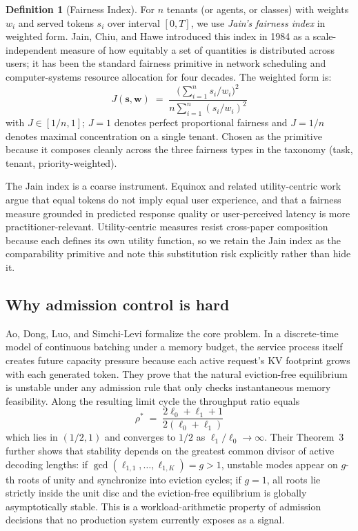 \documentclass[10pt]{article} %
\theoremstyle{definition}
\newtheorem{definition}{Definition}
\begin{document}
\begin{definition}[Fairness Index]
\label{def:fairness}
For $n$ tenants (or agents, or classes) with weights $w_i$ and served
tokens $s_i$ over interval $[0, T]$, we use \emph{Jain's fairness
index} \citep{jain1984fairness} in weighted form. Jain, Chiu, and Hawe
introduced this index in 1984 as a scale-independent measure of how
equitably a set of quantities is distributed across users; it has
been the standard fairness primitive in network scheduling and
computer-systems resource allocation for four decades. The weighted
form is:
%
\begin{equation}
J(\mathbf{s}, \mathbf{w}) \;=\; \frac{\bigl(\sum_{i=1}^{n} s_i / w_i\bigr)^2}{n \sum_{i=1}^{n} (s_i / w_i)^2}
\label{eq:jain}
\end{equation}
%
with $J \in [1/n, 1]$; $J = 1$ denotes perfect proportional fairness
and $J = 1/n$ denotes maximal concentration on a single tenant. Chosen
as the primitive because it composes cleanly across the three
fairness types in the taxonomy (task, tenant, priority-weighted).

The Jain index is a coarse instrument. Equinox \citep{lu2025equinox}
and related utility-centric work argue that equal tokens do not imply
equal user experience, and that a fairness measure grounded in
predicted response quality or user-perceived latency is more
practitioner-relevant. Utility-centric measures resist cross-paper
composition because each defines its own utility function, so we
retain the Jain index as the comparability primitive and note this
substitution risk explicitly rather than hide it.
\end{definition}

\subsection{Why admission control is hard}
\label{sec:whyhard}

Ao, Dong, Luo, and Simchi-Levi \citep{ao2026sic} formalize the core
problem. In a discrete-time model of continuous batching under a memory
budget, the service process itself creates future capacity pressure
because each active request's KV footprint grows with each generated
token. They prove that the natural eviction-free equilibrium is
unstable under any admission rule that only checks instantaneous
memory feasibility. Along the resulting limit cycle the throughput
ratio equals
%
\begin{equation}
\rho^{\ast} \;=\; \frac{2\ell_0 + \ell_1 + 1}{2(\ell_0 + \ell_1)}
\label{eq:throughput-bound}
\end{equation}
%
which lies in $(1/2, 1)$ and converges to $1/2$ as
$\ell_1/\ell_0 \to \infty$. Their Theorem~3 further shows that
stability depends on the greatest common divisor of active decoding
lengths: if $\gcd(\ell_{1,1}, \dots, \ell_{1,K}) = g > 1$, unstable
modes appear on $g$-th roots of unity and synchronize into eviction
cycles; if $g = 1$, all roots lie strictly inside the unit disc and
the eviction-free equilibrium is globally asymptotically stable. This
is a workload-arithmetic property of admission decisions that no
production system currently exposes as a signal.
\end{document}
